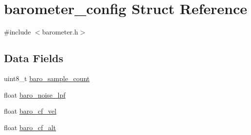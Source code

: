 \hypertarget{structbarometer__config}{\section{barometer\+\_\+config Struct Reference}
\label{structbarometer__config}
}


{\ttfamily \#include $<$barometer.\+h$>$}

\subsection*{Data Fields}
\begin{DoxyCompactItemize}
\item 
uint8\+\_\+t \hyperlink{structbarometer__config_a6b0aeed30705021ffd927c75463b8e55}{baro\+\_\+sample\+\_\+count}
\item 
float \hyperlink{structbarometer__config_a0b39f2fd05190ad19ea7720ccb908022}{baro\+\_\+noise\+\_\+lpf}
\item 
float \hyperlink{structbarometer__config_a66e70e2f183334f120a00902347550d6}{baro\+\_\+cf\+\_\+vel}
\item 
float \hyperlink{structbarometer__config_a32526c74744f31df1377cafc6657be09}{baro\+\_\+cf\+\_\+alt}
\end{DoxyCompactItemize}


